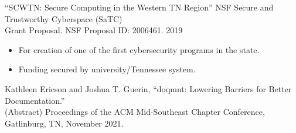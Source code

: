\documentclass[
    10pt,
    A4,
    english,
    draft = false,
    twoside = false,
]{article}
\begin{document}
        {

        \vspace{-10pt}
        \vspace{-15pt}
        \begin{addmargin}[25pt]{10pt}
        “SCWTN: Secure Computing in the Western TN Region” NSF Secure and Trustworthy Cyberspace (SaTC)\\Grant Proposal. NSF Proposal ID: 2006461. 2019
          \vspace{-5pt}
          \hspace{-5pt}
            \begin{itemize}            
              \setlength{\itemsep}{1pt}                                        
              \setlength{\parskip}{0pt}                                        
              \setlength{\parsep}{0pt}                                         
              \item For creation of one of the first cybersecurity programs in the state.
              \item Funding secured by university/Tennessee system.
            \end{itemize}

            \hspace{-15pt}
            Kathleen Ericson and Joshua T. Guerin, “doqmnt: Lowering Barriers for Better Documentation.”\\(Abstract) Proceedings of the ACM Mid-Southeast Chapter Conference, Gatlinburg, TN, November 2021.
        \end{addmargin}

}
\end{document}
